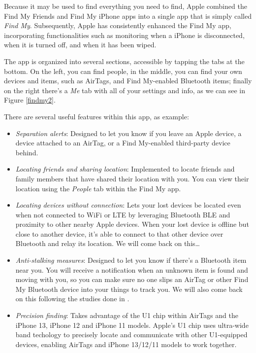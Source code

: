 \documentclass[english]{article}
\begin{document}
Because it may be used to find everything you need to find, Apple combined the Find My Friends and Find My iPhone apps into a single app that is simply called \textit{Find My}. Subsequently, Apple has consistently enhanced the Find My app, incorporating functionalities such as monitoring when a iPhone is disconnected, when it is turned off, and when it has been wiped.

The app is organized into several sections, accessible by tapping the tabs at the bottom. On the left, you can find people, in the middle, you can find your own devices and items, such as AirTags, and Find My-enabled Bluetooth items; finally on the right there's a \textit{Me} tab with all of your settings and info, as we can see in Figure \ref{findmy2}.

There are several useful features within this app, as example:
\begin{itemize}
  \item \textit{Separation alerts}: Designed to let you know if you leave an Apple device, a device attached to an AirTag, or a Find My-enabled third-party device behind.
  \item \textit{Locating friends and sharing location}: Implemented to locate friends and family members that have shared their location with you. You can view their location using the \textit{People} tab within the Find My app.
  \item \textit{Locating devices without connection}: Lets your lost devices be located even when not connected to WiFi or LTE by leveraging Bluetooth BLE and proximity to other nearby Apple devices. When your lost device is offline but close to another device, it's able to connect to that other device over Bluetooth and relay its location. We will come back on this\ldots
  \item \textit{Anti-stalking measures}: Designed to let you know if there's a Bluetooth item near you. You will receive a notification when an unknown item is found and moving with you, so you can make sure no one slips an AirTag or other Find My Bluetooth device into your things to track you. We will also come back on this following the studies done in \cite{airguard}.
  \item \textit{Precision finding}: Takes advantage of the U1 chip within AirTags and the iPhone 13, iPhone 12 and iPhone 11 models. Apple's U1 chip uses ultra-wide band techology to precisely locate and communicate with other U1-equipped devices, enabling AirTags and iPhone 13/12/11 models to work together.
\end{itemize}
\end{document}
